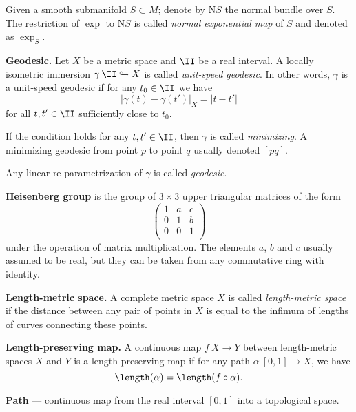 \begin{description}
Given a smooth submanifold $S\subset M$;
denote by $\mathrm{N} S$ the normal bundle over $S$.
The restriction of $\exp$ to $\mathrm{N} S$ is called \emph{normal exponential map} of $S$ and denoted as $\exp_S$. 

\item{\bf Geodesic.}\label{Geodesic} 
Let $X$ be a metric space and $\II$ be a real interval.
A locally isometric immersion $\gamma\:\II\looparrowright X$ is called \emph{unit-speed geodesic}.
In other words, $\gamma$ is a unit-speed geodesic
if for any $t_0\in\II$ we have 
$$|\gamma(t)-\gamma(t')|_X=|t-t'|$$ 
for all $t,t'\in\II$ sufficiently close to $t_0$.

If the condition holds for any $t,t'\in\II$, then $\gamma$ is called \emph{minimizing}.
A minimizing geodesic from point $p$ to point $q$ usually denoted $[pq]$.

Any linear re-parametrization of $\gamma$ is called \emph{geodesic}.

\item{\bf Heisenberg group}\label{Heisenberg group}
is the group of $3\times3$ upper triangular matrices of the form
\[\begin{pmatrix}
 1 & a & c\\
 0 & 1 & b\\
 0 & 0 & 1\\
\end{pmatrix}\]
under the operation of matrix multiplication. The elements $a$, $b$ and $c$ usually assumed to be real,
but they can be taken from any commutative ring with identity.


\item{\bf Length-metric space.}\label{Length-metric space} 
A complete metric space $X$ is called \emph{length-metric space} if the distance between any pair of points in $X$ is equal to the infimum of lengths of curves connecting these points. 




\item{\bf Length-preserving map.}\label{Length-preserving map} 
A continuous map $f\:X\to Y$ between 
length-metric spaces 
$X$ and $Y$ is a length-preserving map if for any path $\alpha\:[0,1]\to X$, we have 
$$\length(\alpha)=\length(f\circ\alpha).$$



\item{\bf Path}\label{Path} --- continuous map from the real interval $[0,1]$ into a topological space. 





\end{description}

